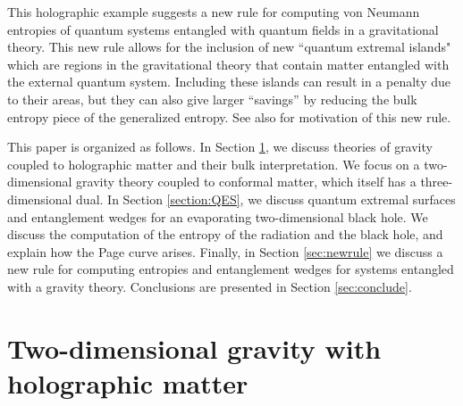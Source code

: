 \documentclass[12pt]{article}
\def\la{\label}
\begin{document}
This holographic example suggests a new rule for computing von Neumann entropies of quantum systems entangled with quantum fields  in a gravitational theory. 
This new rule allows for the inclusion of new ``quantum extremal islands" which are regions in the gravitational theory that contain matter entangled with the external quantum system. 
Including these islands can result in a penalty due to their areas, but they can also give larger ``savings'' by reducing the bulk entropy piece of the generalized entropy. 
See also \cite{Hayden:2018khn,Penington:2019npb}  for motivation of this new rule.

This paper is organized as follows. 
In Section \ref{sec:setup}, we discuss theories of gravity coupled to holographic matter and their bulk interpretation. 
We focus on a two-dimensional gravity theory coupled to conformal matter, which itself has a three-dimensional dual. 
In Section \ref{section:QES}, we discuss quantum extremal surfaces and entanglement wedges for an evaporating two-dimensional black hole. 
We discuss the computation of the entropy of the radiation and the black hole, and explain how the Page curve arises.
Finally, in Section \ref{sec:newrule} we discuss a new rule for computing entropies and entanglement wedges for systems entangled with a gravity theory.  
Conclusions are presented in Section \ref{sec:conclude}.

\section{Two-dimensional gravity with holographic matter}
\label{sec:setup}

 
\end{document}
